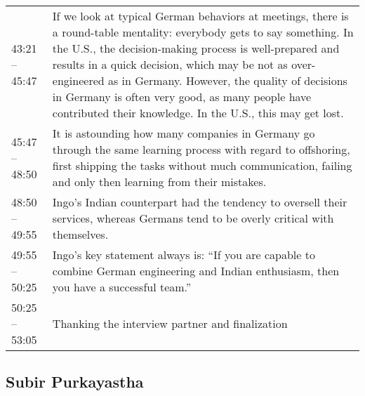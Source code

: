 \begin{appendix}
\begin{longtable}{l p{12.5cm}}
	43:21 -- 45:47&If we look at typical German behaviors at meetings, there is a round-table mentality: everybody gets to say something. In the U.S., the decision-making process is well-prepared and results in a quick decision, which may be not as over-engineered as in Germany. However, the quality of decisions in Germany is often very good, as many people have contributed their knowledge. In the U.S., this may get lost.\\
	45:47 -- 48:50& It is astounding how many companies in Germany go through the same learning process with regard to offshoring, first shipping the tasks without much communication, failing and only then learning from their mistakes.\\
	48:50 -- 49:55&Ingo's Indian counterpart had the tendency to oversell their services, whereas Germans tend to be overly critical with themselves.\\
	49:55 -- 50:25& Ingo's key statement always is: ``If you are capable to combine German engineering and Indian enthusiasm, then you have a successful team.''\\
	50:25 -- 53:05& Thanking the interview partner and finalization\\
\end{longtable}

\newpage
\tocless\subsection{Subir Purkayastha}
\label{int:Subir}


\end{appendix}
